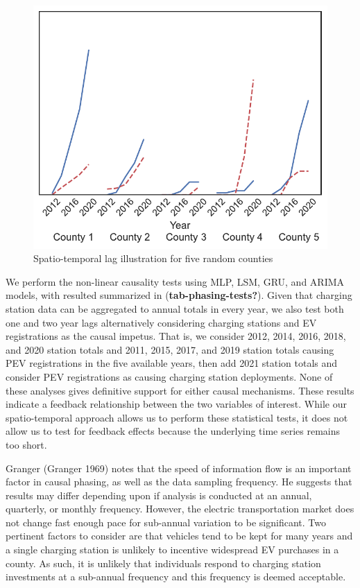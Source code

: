 \documentclass[
  letterpaper,
  DIV=11,
  numbers=noendperiod]{scrartcl}
\begin{document}
\begin{figure}

{\centering \includegraphics{TRB_2023_files/figure-pdf/fig-lags-output-1.pdf}

}

\caption{\label{fig-lags}Spatio-temporal lag illustration for five
random counties}

\end{figure}

We perform the non-linear causality tests using MLP, LSM, GRU, and ARIMA
models, with resulted summarized in (\textbf{tab-phasing-tests?}). Given
that charging station data can be aggregated to annual totals in every
year, we also test both one and two year lags alternatively considering
charging stations and EV registrations as the causal impetus. That is,
we consider 2012, 2014, 2016, 2018, and 2020 station totals and 2011,
2015, 2017, and 2019 station totals causing PEV registrations in the
five available years, then add 2021 station totals and consider PEV
registrations as causing charging station deployments. None of these
analyses gives definitive support for either causal mechanisms. These
results indicate a feedback relationship between the two variables of
interest. While our spatio-temporal approach allows us to perform these
statistical tests, it does not allow us to test for feedback effects
because the underlying time series remains too short.

Granger (Granger 1969) notes that the speed of information flow is an
important factor in causal phasing, as well as the data sampling
frequency. He suggests that results may differ depending upon if
analysis is conducted at an annual, quarterly, or monthly frequency.
However, the electric transportation market does not change fast enough
pace for sub-annual variation to be significant. Two pertinent factors
to consider are that vehicles tend to be kept for many years and a
single charging station is unlikely to incentive widespread EV purchases
in a county. As such, it is unlikely that individuals respond to
charging station investments at a sub-annual frequency and this
frequency is deemed acceptable.
\end{document}

